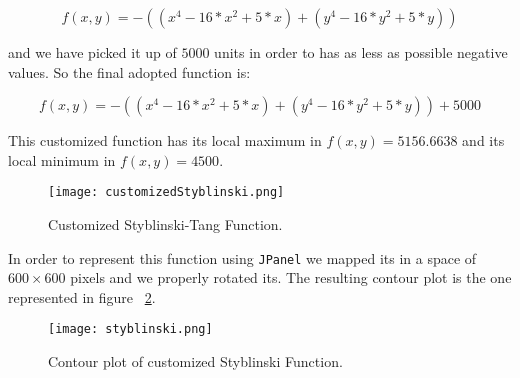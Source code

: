 \begin{equation}
f(x, y) = -((x^4 - 16 * x^2 + 5 * x) + (y^4 - 16 * y^2 + 5 * y))
\end{equation}

and we have picked it up of $5000$ units in order to has as less as possible negative values. So the final adopted function is: 

\begin{equation}
f(x, y) = -((x^4 - 16 * x^2 + 5 * x) + (y^4 - 16 * y^2 + 5 * y)) + 5000
\end{equation}

This customized function has its local maximum in $f(x, y) = 5156.6638$ and its local minimum in $f(x, y) = 4500$. 

\begin{figure}[h!]
	\centering
	\texttt{[image: customizedStyblinski.png]}
	\caption{Customized Styblinski-Tang Function.}
	\label{fig:CustumizedStyblinskiFunction}
\end{figure}

In order to represent this function using {\tt JPanel} we mapped its in a space of $600 \times 600$ pixels and we properly rotated its. The resulting contour plot is the one represented in figure ~\ref{fig:ContourStyblinskiFunction}.

\begin{figure}[h!]
	\centering
	\texttt{[image: styblinski.png]}
	\caption{Contour plot of customized Styblinski Function.}
	\label{fig:ContourStyblinskiFunction}
\end{figure}






